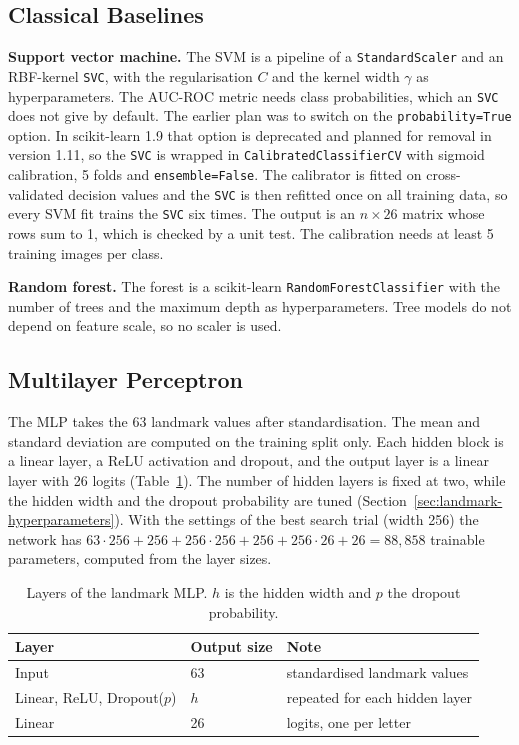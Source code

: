 \subsection{Classical Baselines}

\textbf{Support vector machine.} The SVM is a pipeline of a \texttt{StandardScaler} and an RBF-kernel \texttt{SVC}, with the regularisation $C$ and the kernel width $\gamma$ as hyperparameters. The AUC-ROC metric needs class probabilities, which an \texttt{SVC} does not give by default. The earlier plan was to switch on the \texttt{probability=True} option. In scikit-learn 1.9 that option is deprecated and planned for removal in version 1.11, so the \texttt{SVC} is wrapped in \texttt{CalibratedClassifierCV} with sigmoid calibration, 5 folds and \texttt{ensemble=False}. The calibrator is fitted on cross-validated decision values and the \texttt{SVC} is then refitted once on all training data, so every SVM fit trains the \texttt{SVC} six times. The output is an $n\times26$ matrix whose rows sum to 1, which is checked by a unit test. The calibration needs at least 5 training images per class.

\textbf{Random forest.} The forest is a scikit-learn \texttt{RandomForestClassifier} with the number of trees and the maximum depth as hyperparameters. Tree models do not depend on feature scale, so no scaler is used.

\subsection{Multilayer Perceptron}

The MLP takes the 63 landmark values after standardisation. The mean and standard deviation are computed on the training split only. Each hidden block is a linear layer, a ReLU activation and dropout, and the output layer is a linear layer with 26 logits (Table~\ref{tab:landmark-mlp-layers}). The number of hidden layers is fixed at two, while the hidden width and the dropout probability are tuned (Section~\ref{sec:landmark-hyperparameters}). With the settings of the best search trial (width 256) the network has $63\cdot256+256 + 256\cdot256+256 + 256\cdot26+26 = 88{,}858$ trainable parameters, computed from the layer sizes.

\begin{table}[htbp]
\centering
\caption{Layers of the landmark MLP. $h$ is the hidden width and $p$ the dropout probability.}
\label{tab:landmark-mlp-layers}
\begin{tabular}{lll}
\toprule
Layer & Output size & Note \\
\midrule
Input & 63 & standardised landmark values \\
Linear, ReLU, Dropout($p$) & $h$ & repeated for each hidden layer \\
Linear & 26 & logits, one per letter \\
\bottomrule
\end{tabular}
\end{table}

